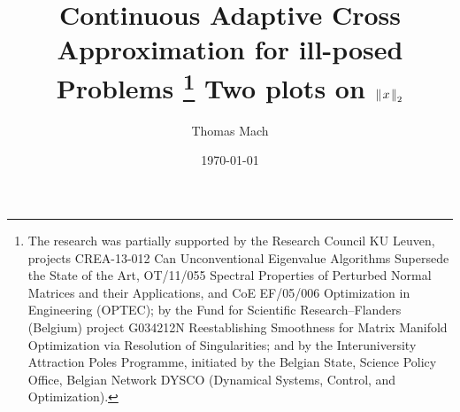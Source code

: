 \documentclass[final]{siamltex}
\title{Continuous Adaptive Cross Approximation for ill-posed Problems%
  \thanks{The research was partially supported %
    by the Research Council KU Leuven, projects %
    CREA-13-012 Can Unconventional Eigenvalue Algorithms Supersede the State of
    the Art, %
    OT/11/055 Spectral Properties of Perturbed Normal Matrices and their
    Applications, %
    and CoE EF/05/006 Optimization in Engineering (OPTEC); %
    by the Fund for Scientific Research--Flanders (Belgium) project G034212N
    Reestablishing Smoothness for Matrix Manifold Optimization via Resolution
    of Singularities; and %
    by the Interuniversity Attraction Poles Programme, initiated by the Belgian
    State, Science Policy Office, Belgian Network DYSCO (Dynamical Systems,
    Control, and Optimization).}
}
\title{Two plots on $\mbox{$\parallel\!x\!\parallel$}_{2}$}
\author{Thomas Mach}
\begin{document}
\maketitle

\renewcommand{\thefootnote}{\fnsymbol{footnote}}



\renewcommand{\thefootnote}{\arabic{footnote}}


\date{\today}
\maketitle




\pagestyle{myheadings} %
\thispagestyle{plain} %
\end{document}
